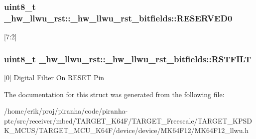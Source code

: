 \subsubsection[{\texorpdfstring{R\+E\+S\+E\+R\+V\+E\+D0}{RESERVED0}}]{\setlength{\rightskip}{0pt plus 5cm}uint8\+\_\+t \+\_\+hw\+\_\+llwu\+\_\+rst\+::\+\_\+hw\+\_\+llwu\+\_\+rst\+\_\+bitfields\+::\+R\+E\+S\+E\+R\+V\+E\+D0}\hypertarget{struct__hw__llwu__rst_1_1__hw__llwu__rst__bitfields_a298570a5081dd64611bda13729d155f1}{}\label{struct__hw__llwu__rst_1_1__hw__llwu__rst__bitfields_a298570a5081dd64611bda13729d155f1}
\mbox{[}7\+:2\mbox{]} 
\subsubsection[{\texorpdfstring{R\+S\+T\+F\+I\+LT}{RSTFILT}}]{\setlength{\rightskip}{0pt plus 5cm}uint8\+\_\+t \+\_\+hw\+\_\+llwu\+\_\+rst\+::\+\_\+hw\+\_\+llwu\+\_\+rst\+\_\+bitfields\+::\+R\+S\+T\+F\+I\+LT}\hypertarget{struct__hw__llwu__rst_1_1__hw__llwu__rst__bitfields_a01cc751dffb5e790ae8d84c15335e840}{}\label{struct__hw__llwu__rst_1_1__hw__llwu__rst__bitfields_a01cc751dffb5e790ae8d84c15335e840}
\mbox{[}0\mbox{]} Digital Filter On R\+E\+S\+ET Pin 

The documentation for this struct was generated from the following file\+:\begin{DoxyCompactItemize}
\item 
/home/erik/proj/piranha/code/piranha-\/ptc/src/receiver/mbed/\+T\+A\+R\+G\+E\+T\+\_\+\+K64\+F/\+T\+A\+R\+G\+E\+T\+\_\+\+Freescale/\+T\+A\+R\+G\+E\+T\+\_\+\+K\+P\+S\+D\+K\+\_\+\+M\+C\+U\+S/\+T\+A\+R\+G\+E\+T\+\_\+\+M\+C\+U\+\_\+\+K64\+F/device/device/\+M\+K64\+F12/M\+K64\+F12\+\_\+llwu.\+h\end{DoxyCompactItemize}
